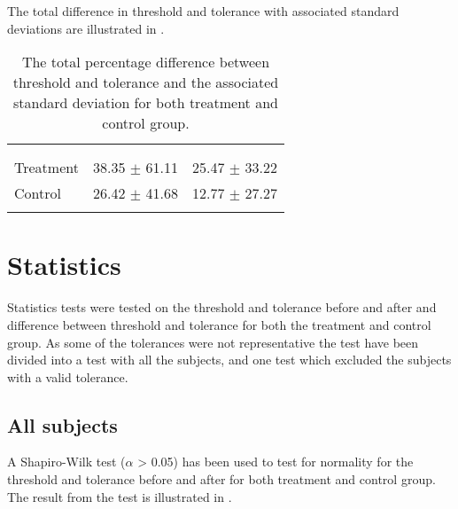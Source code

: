 The total difference in threshold and tolerance with associated standard deviations are illustrated in . 

\begin{longtable} {l|c|c}
 \rowcolor[HTML]{C0C0C0} 
  \color[HTML]{000000}{} & 
\color[HTML]{000000}{\textbf{Threshold}} & \color[HTML]{000000}{\textbf{Tolerance}} 	\\  \rule{0pt}{3ex} 
\cellcolor[HTML]{C0C0C0}{} &
 \cellcolor[HTML]{C0C0C0}{Difference [\%]} &  \cellcolor[HTML]{C0C0C0}{Difference [\%]} \\ \hline
Treatment & 38.35 $\pm$ 61.11 & 25.47 $\pm$ 33.22 \\ \hline
Control & 26.42 $\pm$ 41.68 & 12.77 $\pm$ 27.27 \\ \hline
	\caption{The total percentage difference between threshold and tolerance and the associated standard deviation for both treatment and control group.}
	\label{tab:Total}
\end{longtable}
\vspace{-.5cm}


\section{Statistics}
Statistics tests were tested on the threshold and tolerance before and after and difference between threshold and tolerance for both the treatment and control group. As some of the tolerances were not representative the test have been divided into a test with all the subjects, and one test which excluded the subjects with a valid tolerance.

\subsection{All subjects}
A Shapiro-Wilk test ($\alpha$ > 0.05) has been used to test for normality for the threshold and tolerance before and after for both treatment and control group. The result from the test is illustrated in .

